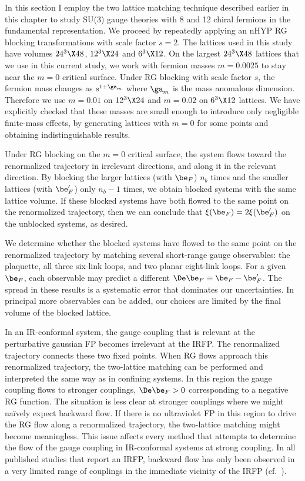 
In this section I employ the two lattice matching technique described earlier in this chapter to study SU(3) gauge theories with 8 and 12 chiral fermions in the fundamental representation.
We proceed by repeatedly applying an nHYP RG blocking transformations with scale factor $s = 2$.
The lattices used in this study have volumes $24^3\X48$, $12^3\X24$ and $6^3\X12$.
On the largest $24^3\X48$ lattices that we use in this current study, we work with fermion masses $m = 0.0025$ to stay near the $m = 0$ critical surface.
Under RG blocking with scale factor $s$, the fermion mass changes as $s^{1 + \ga_m}$ where $\ga_m$ is the mass anomalous dimension.
Therefore we use $m = 0.01$ on $12^3\X24$ and $m = 0.02$ on $6^3\X12$ lattices.
We have explicitly checked that these masses are small enough to introduce only negligible finite-mass effects, by generating lattices with $m = 0$ for some points and obtaining indistinguishable results.

Under RG blocking on the $m = 0$ critical surface, the system flows toward the renormalized trajectory in irrelevant directions, and along it in the relevant direction.
By blocking the larger lattices (with $\be_F$) $n_b$ times and the smaller lattices (with $\be_F'$) only $n_b - 1$ times, we obtain blocked systems with the same lattice volume.
If these blocked systems have both flowed to the same point on the renormalized trajectory, then we can conclude that $\xi(\be_F) = 2\xi(\be_F')$ on the unblocked systems, as desired.

We determine whether the blocked systems have flowed to the same point on the renormalized trajectory by matching several short-range gauge observables: the plaquette, all three six-link loops, and two planar eight-link loops.
For a given $\be_F$, each observable may predict a different $\De\be_F \equiv \be_F - \be_F'$.
The spread in these results is a systematic error that dominates our uncertainties.
In principal more observables can be added, our choices are limited by the final volume of the blocked lattice.

In an IR-conformal system, the gauge coupling that is relevant at the perturbative gaussian FP becomes irrelevant at the IRFP.
The renormalized trajectory connects these two fixed points.
When RG flows approach this renormalized trajectory, the two-lattice matching can be performed and interpreted the same way as in confining systems.
In this region the gauge coupling flows to stronger couplings, $\De\be_F > 0$ corresponding to a negative RG \be function.
The situation is less clear at stronger couplings where we might na\"ively expect backward flow.
If there is no ultraviolet FP in this region to drive the RG flow along a renormalized trajectory, the two-lattice matching might become meaningless.
This issue affects every method that attempts to determine the flow of the gauge coupling in IR-conformal systems at strong coupling.
In all published studies that report an IRFP, backward flow has only been observed in a very limited range of couplings in the immediate vicinity of the IRFP (cf.~).

